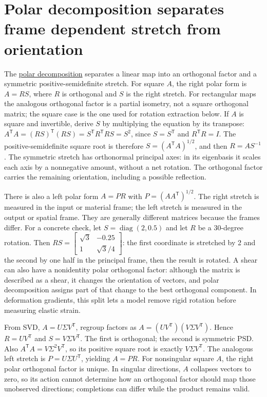 \section{Polar decomposition separates frame dependent stretch from orientation}\label{02-foundations-ii-ch024-polar-decomposition-separates-frame-dependent-stretch-from-orientation}

The \hyperref[02-foundations-ii-ch024-polar-decomposition-separates-frame-dependent-stretch-from-orientation]{polar decomposition} separates a linear map into an orthogonal factor and a symmetric positive-semidefinite stretch. For square \(A\), the right polar form is \(A=RS\), where \(R\) is orthogonal and \(S\) is the right stretch. For rectangular maps the analogous orthogonal factor is a partial isometry, not a square orthogonal matrix; the square case is the one used for rotation extraction below. If \(A\) is square and invertible, derive \(S\) by multiplying the equation by its transpose: \(A^\mathsf TA=(RS)^\mathsf T(RS)=S^\mathsf TR^\mathsf TRS=S^2\), since \(S=S^\mathsf T\) and \(R^\mathsf TR=I\). The positive-semidefinite square root is therefore \(S=(A^\mathsf TA)^{1/2}\), and then \(R=AS^{-1}\). The symmetric stretch has orthonormal principal axes: in its eigenbasis it scales each axis by a nonnegative amount, without a net rotation. The orthogonal factor carries the remaining orientation, including a possible reflection.

There is also a left polar form \(A=PR\) with \(P=(AA^\mathsf T)^{1/2}\). The right stretch is measured in the input or material frame; the left stretch is measured in the output or spatial frame. They are generally different matrices because the frames differ. For a concrete check, let \(S=\operatorname{diag}(2,0.5)\) and let \(R\) be a 30-degree rotation. Then \(RS=\begin{bmatrix}\sqrt3&-0.25\\1&\sqrt3/4\end{bmatrix}\): the first coordinate is stretched by 2 and the second by one half in the principal frame, then the result is rotated. A shear can also have a nonidentity polar orthogonal factor: although the matrix is described as a shear, it changes the orientation of vectors, and polar decomposition assigns part of that change to the best orthogonal component. In deformation gradients, this split lets a model remove rigid rotation before measuring elastic strain.

From SVD, \(A=U\Sigma V^\mathsf T\), regroup factors as \(A=(UV^\mathsf T)(V\Sigma V^\mathsf T)\). Hence \(R=UV^\mathsf T\) and \(S=V\Sigma V^\mathsf T\). The first is orthogonal; the second is symmetric PSD. Also \(A^\mathsf TA=V\Sigma^2V^\mathsf T\), so its positive square root is exactly \(V\Sigma V^\mathsf T\). The analogous left stretch is \(P=U\Sigma U^\mathsf T\), yielding \(A=PR\). For nonsingular square \(A\), the right polar orthogonal factor is unique. In singular directions, \(A\) collapses vectors to zero, so its action cannot determine how an orthogonal factor should map those unobserved directions; completions can differ while the product remains valid.

